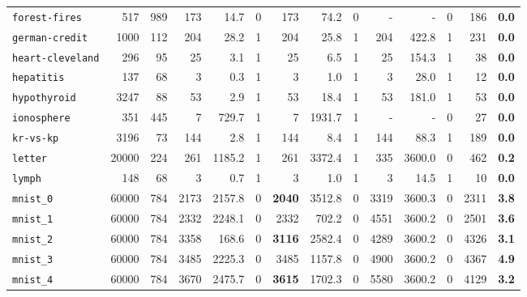 \begin{tabular}{lccrrrrrrrrrrr}
\texttt{forest-fires} & \multicolumn{1}{r}{517} & \multicolumn{1}{r}{989}  & 173 & 14.7 & 0 & 173 & 74.2 & 0 & - & - & 0 & 186 & \textbf{0.0}\\
\texttt{german-credit} & \multicolumn{1}{r}{1000} & \multicolumn{1}{r}{112}  & 204 & 28.2 & 1 & 204 & 25.8 & 1 & 204 & 422.8 & 1 & 231 & \textbf{0.0}\\
\texttt{heart-cleveland} & \multicolumn{1}{r}{296} & \multicolumn{1}{r}{95}  & 25 & 3.1 & 1 & 25 & 6.5 & 1 & 25 & 154.3 & 1 & 38 & \textbf{0.0}\\
\texttt{hepatitis} & \multicolumn{1}{r}{137} & \multicolumn{1}{r}{68}  & 3 & 0.3 & 1 & 3 & 1.0 & 1 & 3 & 28.0 & 1 & 12 & \textbf{0.0}\\
\texttt{hypothyroid} & \multicolumn{1}{r}{3247} & \multicolumn{1}{r}{88}  & 53 & 2.9 & 1 & 53 & 18.4 & 1 & 53 & 181.0 & 1 & 53 & \textbf{0.0}\\
\texttt{ionosphere} & \multicolumn{1}{r}{351} & \multicolumn{1}{r}{445}  & 7 & 729.7 & 1 & 7 & 1931.7 & 1 & - & - & 0 & 27 & \textbf{0.0}\\
\texttt{kr-vs-kp} & \multicolumn{1}{r}{3196} & \multicolumn{1}{r}{73}  & 144 & 2.8 & 1 & 144 & 8.4 & 1 & 144 & 88.3 & 1 & 189 & \textbf{0.0}\\
\texttt{letter} & \multicolumn{1}{r}{20000} & \multicolumn{1}{r}{224}  & 261 & 1185.2 & 1 & 261 & 3372.4 & 1 & 335 & 3600.0 & 0 & 462 & \textbf{0.2}\\
\texttt{lymph} & \multicolumn{1}{r}{148} & \multicolumn{1}{r}{68}  & 3 & 0.7 & 1 & 3 & 1.0 & 1 & 3 & 14.5 & 1 & 10 & \textbf{0.0}\\
\texttt{mnist\_0} & \multicolumn{1}{r}{60000} & \multicolumn{1}{r}{784}  & 2173 & 2157.8 & 0 & \textbf{2040} & 3512.8 & 0 & 3319 & 3600.3 & 0 & 2311 & \textbf{3.8}\\
\texttt{mnist\_1} & \multicolumn{1}{r}{60000} & \multicolumn{1}{r}{784}  & 2332 & 2248.1 & 0 & 2332 & 702.2 & 0 & 4551 & 3600.2 & 0 & 2501 & \textbf{3.6}\\
\texttt{mnist\_2} & \multicolumn{1}{r}{60000} & \multicolumn{1}{r}{784}  & 3358 & 168.6 & 0 & \textbf{3116} & 2582.4 & 0 & 4289 & 3600.2 & 0 & 4326 & \textbf{3.1}\\
\texttt{mnist\_3} & \multicolumn{1}{r}{60000} & \multicolumn{1}{r}{784}  & 3485 & 2225.3 & 0 & 3485 & 1157.8 & 0 & 4900 & 3600.2 & 0 & 4367 & \textbf{4.9}\\
\texttt{mnist\_4} & \multicolumn{1}{r}{60000} & \multicolumn{1}{r}{784}  & 3670 & 2475.7 & 0 & \textbf{3615} & 1702.3 & 0 & 5580 & 3600.2 & 0 & 4129 & \textbf{3.2}\\

\end{tabular}
